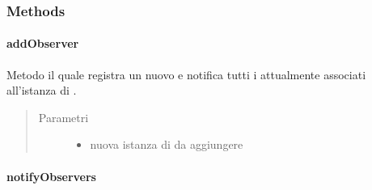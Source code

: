 \documentclass[letterpaper,10pt,italian,openany,oneside]{sphinxmanual}
\begin{document}
\subsubsection{Methods}
\label{\detokenize{test/it/unicam/cs/pa/mastermind/gamecore/Observable:methods}}

\paragraph{addObserver}
\label{\detokenize{test/it/unicam/cs/pa/mastermind/gamecore/Observable:addobserver}}

\begin{fulllineitems}
\label{\detokenize{test/it/unicam/cs/pa/mastermind/gamecore/Observable:it.unicam.cs.pa.mastermind.gamecore.Observable.addObserver(Observer)}}
Metodo il quale registra un nuovo  e notifica tutti i  attualmente associati all’istanza di .
\begin{quote}\begin{description}
\item[{Parametri}] \leavevmode\begin{itemize}
\item {} 
 \textendash{} nuova istanza di  da aggiungere

\end{itemize}

\end{description}\end{quote}

\end{fulllineitems}



\paragraph{notifyObservers}
\label{\detokenize{test/it/unicam/cs/pa/mastermind/gamecore/Observable:notifyobservers}}
\end{document}
